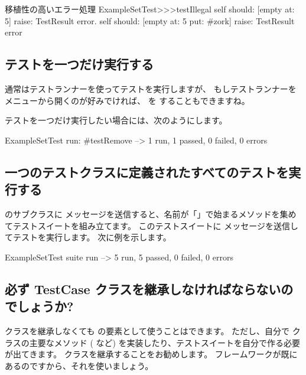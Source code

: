 \documentclass[a4paper,10pt,twoside]{book}
\begin{document}
\begin{method}[portabletestillegal]{移植性の高いエラー処理}
ExampleSetTest>>>testIllegal
	self should: [empty at: 5] raise: TestResult error.
	self should: [empty at: 5 put: #zork] raise: TestResult error
\end{method}


\subsection{テストを一つだけ実行する}
通常はテストランナーを使ってテストを実行しますが、
もしテストランナーを  メニューから開くのが好みでければ、 を  することもできますね。

テストを一つだけ実行したい場合には、次のようにします。

\begin{code}{}
ExampleSetTest run: #testRemove --> 1 run, 1 passed, 0 failed, 0 errors
\end{code}

\subsection{一つのテストクラスに定義されたすべてのテストを実行する}

 のサブクラスに  メッセージを送信すると、名前が「」で始まるメソッドを集めてテストスイートを組み立てます。
このテストスイートに  メッセージを送信してテストを実行します。
次に例を示します。

\begin{code}{}
ExampleSetTest suite run --> 5 run, 5 passed, 0 failed, 0 errors
\end{code}

\subsection{必ず TestCase クラスを継承しなければならないのでしょうか?}

 クラスを継承しなくても  の要素として使うことはできます。
ただし、自分で  クラスの主要なメソッド ( など) を実装したり、テストスイートを自分で作る必要が出てきます。
 クラスを継承することをお勧めします。
フレームワークが既にあるのですから、それを使いましょう。
\end{document}
